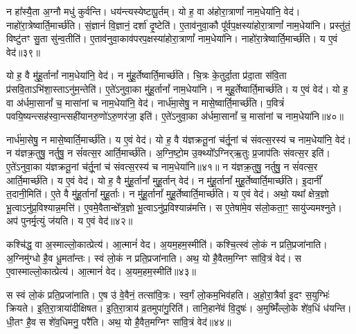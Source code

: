    न हा᳚स्यै॒ता अ॒ग्नौ मधु॑ कुर्वन्ति।
   धय॑न्त्यस्येष्टापू॒र्तम्।
   यो ह॒ वा अ॑होरा॒त्राणां᳚ नाम॒धेया॑नि॒ वेद॑।
   नाहो॑रा॒त्रेष्वार्ति॒मार्च्छ॑ति।
   सं॒ज्ञानं॑ वि॒ज्ञानं॒ दर्\mbox{}शा॑ दृ॒ष्टेति॑।
   ए॒ताव॑नुवा॒कौ पू᳚र्वप॒क्षस्या॑\-होरा॒त्राणां᳚ नाम॒धेया॑नि।
   प्रस्तु॑तं॒ विष्टु॑तꣳ सु॒ता सु॑न्व॒तीति॑।
   ए॒ताव॑नुवा॒काव॑पर\-प॒क्षस्या॑होरा॒त्राणां᳚ नाम॒धेया॑नि।
   नाहो॑रा॒त्रेष्वार्ति॒मार्च्छ॑ति।
   य ए॒वं वेद॑॥३९॥

   यो ह॒ वै मु॑हू॒र्तानां᳚ नाम॒धेया॑नि॒ वेद॑।
   न मु॑हू॒र्तेष्वार्ति॒मार्च्छ॑ति।
   चि॒त्रः के॒तुर्दा॒ता प्र॑दा॒ता स॑वि॒ता प्र॑सवि॒ताऽभि॑शा॒स्ताऽनु॑\-म॒न्तेति॑।
   ए॒ते॑ऽनुवा॒का मु॑हू॒र्तानां᳚ नाम॒धेया॑नि।
   न मुहू॒र्तेष्वार्ति॒मार्च्छ॑ति।
   य ए॒वं वेद॑।
   यो ह॒ वा अ॑र्धमा॒सानां᳚ च॒ मासा॑नां च नाम॒धेया॑नि॒ वेद॑।
   नार्ध॑मा॒सेषु॒ न मासे॒ष्वार्ति॒मार्च्छ॑ति।
   प॒वित्रं॑ पवयि॒ष्यन्त्सह॑\-स्वा॒न्त्सही॑यानरु॒णो॑ऽरु॒णर॑जा॒ इति॑।
   ए॒ते॑ऽनुवा॒का अ॑र्धमा॒सानां᳚ च॒ मासा॑नां च नाम॒धेया॑नि॥४०॥

   नार्ध॑मा॒सेषु॒ न मासे॒ष्वार्ति॒मार्च्छ॑ति।
   य ए॒वं वेद॑।
   यो ह॒ वै य॑ज्ञक्रतू॒नां च॑र्तू॒नां च॑ संवत्स॒रस्य॑ च नाम॒धेया॑नि॒ वेद॑।
   न य॑ज्ञक्र॒तुषु॒ नर्तुषु॒ न सं॑वत्स॒र आर्ति॒मार्च्छ॑ति।
   अ॒ग्नि॒ष्टो॒म उ॒क्थ्यो᳚ऽग्निर्{‌}ऋ॒तुः प्र॒जाप॑तिः संवत्स॒र इति॑।
   ए॒ते॑ऽनुवा॒का य॑ज्ञक्रतू॒नां च॑र्तू॒नां च॑ संवत्स॒रस्य॑ च नाम॒धेया॑नि॥४१॥
   न य॑ज्ञक्र॒तुषु॒ नर्तुषु॒ न सं॑वत्स॒र आर्ति॒मार्च्छ॑ति।
   य ए॒वं वेद॑।
   यो ह॒ वै मु॑हू॒र्तानां᳚ मुहू॒र्तान् वेद॑।
   न मु॑हू॒र्तानां᳚ मुहू॒र्तेष्वार्ति॒मार्च्छ॑ति।
   इ॒दानीं᳚ त॒दानी॒मिति॑।
   ए॒ते वै मु॑हू॒र्तानां᳚ मुहू॒र्ताः।
   न मु॑हू॒र्तानां᳚ मुहू॒र्तेष्वार्ति॒मार्च्छ॑ति।
   य ए॒वं वेद॑।
   अथो॒ यथा᳚ क्षेत्र॒ज्ञो भू॒त्वाऽनु॑प्र॒विश्यान्न॒मत्ति॑।
   ए॒वमे॒वैतान्क्षे᳚त्र॒ज्ञो भू॒त्वाऽनु॑प्र॒विश्यान्न॑मत्ति।
   स ए॒तेषा॑मे॒व स॑लो॒कता॒ꣳ॒ सायु॑ज्यमश्नुते।
   अप॑ पुनर्मृ॒त्युं ज॑यति।
   य ए॒वं वेद॑॥४२॥
\anuvakamend
				
   कश्चि॑द्ध॒ वा अ॒स्माल्लो॒कात्प्रेत्य॑।
   आ॒त्मानं॑ वेद।
   अ॒यम॒हम॒स्मीति॑।
   कश्चि॒त्स्वं लो॒कं न प्रति॒प्रजा॑नाति।
   अ॒ग्निमु॑ग्धो है॒व धू॒मता᳚न्तः।
   स्वं लो॒कं न प्रति॒प्रजा॑नाति।
   अथ॒ यो है॒वैतम॒ग्निꣳ सा॑वि॒त्रं वेद॑।
   स ए॒वास्माल्लो॒कात्प्रेत्य॑।
   आ॒त्मानं॑ वेद।
   अ॒यम॒हम॒स्मीति॑॥४३॥

   स स्वं लो॒कं प्रति॒प्रजा॑नाति।
   ए॒ष उ॑ वे॒वैनं॒ तत्सा॑वि॒त्रः।
   स्व॒र्गं लो॒कम॒भिव॑हति।
   अ॒हो॒रा॒त्रैर्वा इ॒दꣳ स॒युग्भिः॑ क्रियते।
   इ॒ति॒रा॒त्राया॑दीक्षिषत।
   इ॒ति॒रा॒त्राय॑ व्र॒तमुपा॑गु॒रिति॑।
   तानि॒हाने॑वं वि॒दुषः॑।
   अ॒मुष्मिँ॑ल्लो॒के शे॑व॒धिं ध॑यन्ति।
   धी॒तꣳ है॒व स शे॑व॒धिमनु॒ परै॑ति।
   अथ॒ यो है॒वैत॒मग्निꣳ सा॑वि॒त्रं वेद॑॥४४॥

